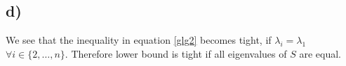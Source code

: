 \documentclass[paper=a4,fontsize=10pt,DIV11,BCOR10mm]{scrartcl}
\begin{document}
\subsection*{d)}
 We see that the inequality in equation \ref{glg2} becomes tight, if $\lambda_i=\lambda_1$ $\forall i \in \{2,\dots ,n\}$. Therefore lower bound is tight if all eigenvalues of $S$ are equal.



\end{document}
